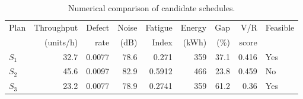 \begin{table}[htbp]
\centering
\caption{Numerical comparison of candidate schedules.}
\label{tab:numerical-sim}
\small
\begin{tabular}{@{}lrrrrrrrl@{}}
\toprule
Plan & Throughput & Defect & Noise & Fatigue & Energy & Gap & V/R & Feasible \\
     & (units/h)  & rate   & (dB)  & Index   & (kWh)  & (\%) & score &         \\
\midrule
$S_{1}$ & 32.7 & 0.0077 & 78.6 & 0.271 & 359 & 37.1 & 0.416 & Yes \\
$S_{2}$ & 45.6 & 0.0097 & 82.9 & 0.5912 & 466 & 23.8 & 0.459 & No \\
$S_{3}$ & 23.2 & 0.0077 & 78.9 & 0.2741 & 359 & 61.2 & 0.36 & Yes \\
\bottomrule
\end{tabular}
\end{table}
